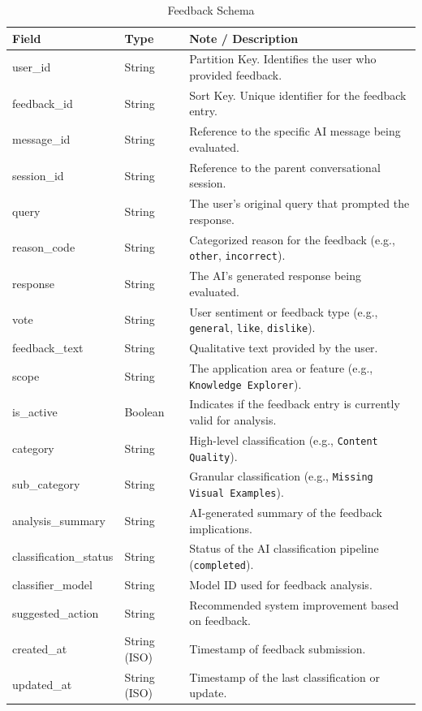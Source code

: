 \begin{table}[H]
    \centering
    \begin{tabular}{llp{8cm}}
        \toprule
        \textbf{Field} & \textbf{Type} & \textbf{Note / Description} \\
        \midrule
        user\_id & String & Partition Key. Identifies the user who provided feedback. \\
        feedback\_id & String & Sort Key. Unique identifier for the feedback entry. \\
        \midrule
        message\_id & String & Reference to the specific AI message being evaluated. \\
        session\_id & String & Reference to the parent conversational session. \\
        query & String & The user's original query that prompted the response. \\
        reason\_code & String & Categorized reason for the feedback (e.g., \texttt{other}, \texttt{incorrect}). \\
        response & String & The AI's generated response being evaluated. \\
        vote & String & User sentiment or feedback type (e.g., \texttt{general}, \texttt{like}, \texttt{dislike}). \\
        feedback\_text & String & Qualitative text provided by the user. \\
        scope & String & The application area or feature (e.g., \texttt{Knowledge Explorer}). \\
        is\_active & Boolean & Indicates if the feedback entry is currently valid for analysis. \\
        category & String & High-level classification (e.g., \texttt{Content Quality}). \\
        sub\_category & String & Granular classification (e.g., \texttt{Missing Visual Examples}). \\
        analysis\_summary & String & AI-generated summary of the feedback implications. \\
        classification\_status & String & Status of the AI classification pipeline (\texttt{completed}). \\
        classifier\_model & String & Model ID used for feedback analysis. \\
        suggested\_action & String & Recommended system improvement based on feedback. \\
        created\_at & String (ISO) & Timestamp of feedback submission. \\
        updated\_at & String (ISO) & Timestamp of the last classification or update. \\
        \bottomrule
    \end{tabular}
    \caption{Feedback Schema}
    \label{tab:feedback_results}
\end{table}

